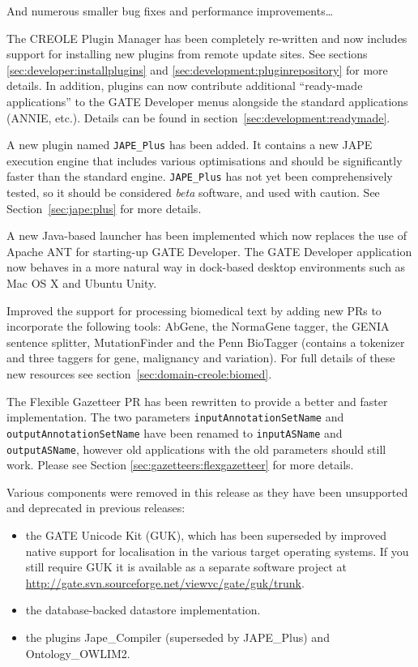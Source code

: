 And numerous smaller bug fixes and performance improvements\ldots




The CREOLE Plugin Manager has been completely re-written and now includes
support for installing new plugins from remote update sites. See sections
\ref{sec:developer:installplugins} and \ref{sec:development:pluginrepository}
for more details.  In addition, plugins can now contribute additional
``ready-made applications'' to the GATE Developer menus alongside the standard
applications (ANNIE, etc.).  Details can be found in
section~\ref{sec:development:readymade}.

A new plugin named \texttt{JAPE\_Plus} has been added. It contains a new JAPE
execution engine that includes various optimisations and should be significantly
faster than the standard engine. \texttt{JAPE\_Plus} has not yet been
comprehensively tested, so it should be considered {\em beta} software, and used
with caution. See Section~\ref{sec:jape:plus} for more details.

A new Java-based launcher has been implemented which now replaces the use of
Apache ANT for starting-up GATE Developer.  The GATE Developer application now
behaves in a more natural way in dock-based desktop environments such as Mac OS
X and Ubuntu Unity.

Improved the support for processing biomedical text by adding new PRs to
incorporate the following tools: AbGene, the NormaGene tagger, the GENIA
sentence splitter, MutationFinder and the Penn BioTagger (contains a tokenizer
and three taggers for gene, malignancy and variation). For full details of
these new resources see section~\ref{sec:domain-creole:biomed}.

The Flexible Gazetteer PR has been rewritten to provide a better and faster
implementation.  The two parameters \texttt{inputAnnotationSetName} and
\texttt{outputAnnotationSetName} have been renamed to \texttt{inputASName} and
\texttt{outputASName}, however old applications with the old parameters
should still work.  Please see Section \ref{sec:gazetteers:flexgazetteer} for
more details.


Various components were removed in this release as they have been unsupported
and deprecated in previous releases:
\begin{itemize}
\item the GATE Unicode Kit (GUK), which has been superseded by improved native
  support for localisation in the various target operating systems.  If you
  still require GUK it is available as a separate software project at
  \url{http://gate.svn.sourceforge.net/viewvc/gate/guk/trunk}.
\item the database-backed datastore implementation.
\item the plugins Jape\_Compiler (superseded by JAPE\_Plus) and
  Ontology\_OWLIM2.
\end{itemize}

